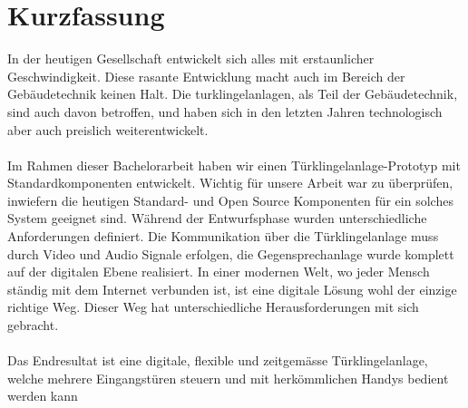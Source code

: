 \section*{Kurzfassung}
\label{sec:zusammenfassung}

In der heutigen Gesellschaft entwickelt sich alles mit erstaunlicher Geschwindigkeit. Diese rasante Entwicklung macht auch im Bereich der Gebäudetechnik keinen Halt. Die \gls{turklingelanlage}n, als Teil der Gebäudetechnik, sind auch davon betroffen, und haben sich in den letzten Jahren technologisch aber auch preislich weiterentwickelt. 
\\
\\
Im Rahmen dieser Bachelorarbeit haben wir einen Türklingelanlage-Prototyp mit Standardkomponenten entwickelt. Wichtig für unsere Arbeit war zu überprüfen, inwiefern die heutigen Standard- und Open Source Komponenten für ein solches System geeignet sind. Während der Entwurfsphase wurden unterschiedliche Anforderungen definiert. Die Kommunikation über die Türklingelanlage muss durch Video und Audio Signale erfolgen, die Gegensprechanlage wurde komplett auf der digitalen Ebene realisiert. In einer modernen Welt, wo jeder Mensch ständig mit dem Internet verbunden ist, ist eine digitale Lösung wohl der einzige richtige Weg. Dieser Weg hat unterschiedliche Herausforderungen mit sich gebracht. 
\\
\\
Das Endresultat ist eine digitale, flexible und zeitgemässe Türklingelanlage, welche mehrere Eingangstüren steuern und mit herkömmlichen Handys bedient werden kann
